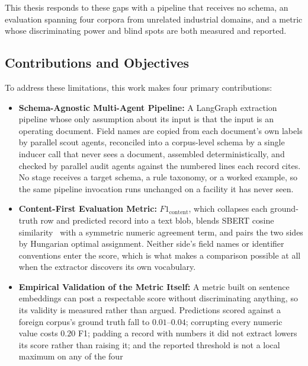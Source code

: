 \documentclass[11pt]{article}
\begin{document}
This thesis responds to these gaps with a pipeline that receives no schema, an evaluation spanning four corpora from unrelated industrial domains, and a metric whose discriminating power and blind spots are both measured and reported.

\subsection{Contributions and Objectives}
To address these limitations, this work makes four primary contributions:
\begin{itemize}
    \item \textbf{Schema-Agnostic Multi-Agent Pipeline:} A LangGraph extraction
          pipeline whose only assumption about its input is that the input is an
          operating document. Field names are copied from each document's own
          labels by parallel scout agents, reconciled into a corpus-level schema
          by a single inducer call that never sees a document, assembled
          deterministically, and checked by parallel audit agents against the
          numbered lines each record cites. No stage receives a target schema, a
          rule taxonomy, or a worked example, so the same pipeline invocation
          runs unchanged on a facility it has never seen.
    \item \textbf{Content-First Evaluation Metric:} \(F1_{\text{content}}\),
          which collapses each ground-truth row and predicted record into a text
          blob, blends SBERT cosine similarity~\cite{reimers2019sbert} with a
          symmetric numeric agreement term, and pairs the two sides by Hungarian
          optimal assignment. Neither side's field names or identifier conventions enter
          the score, which is what makes a comparison possible at all when the
          extractor discovers its own vocabulary.
    \item \textbf{Empirical Validation of the Metric Itself:} A metric built on
          sentence embeddings can post a respectable score without discriminating
          anything, so its validity is measured rather than argued. Predictions
          scored against a foreign corpus's ground truth fall to $0.01$--$0.04$;
          corrupting every numeric value costs $0.20$ F1; padding a record with
          numbers it did not extract lowers its score rather than raising it;
          and the reported threshold is not a local maximum on any of the four

\end{itemize}
\end{document}
